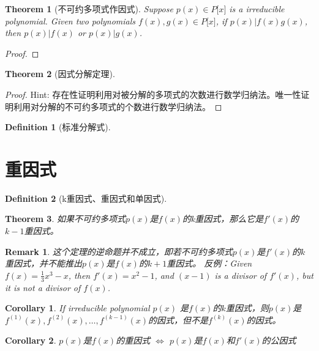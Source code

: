 \documentclass[onecolumn]{ctexart}
\newtheorem{definition}{Definition}
\newtheorem{theorem}{Theorem}
\newtheorem{corollary}{Corollary}
\newtheorem{remark}{Remark}
\begin{document}
\begin{theorem}[不可约多项式作因式]
  Suppose $p(x) \in P\lbrack x \rbrack$ is a irreducible polynomial. Given two 
  polynomials $f(x), g(x) \in P\lbrack x \rbrack$, if $p(x) | f(x)g(x)$, then 
  $p(x) | f(x)$ or $p(x) | g(x)$.
\end{theorem}
\begin{proof}
  
\end{proof}

\begin{theorem}[因式分解定理]
  
\end{theorem}
\begin{proof}
  Hint: 存在性证明利用对被分解的多项式的次数进行数学归纳法。唯一性证明利用对分解的不可约多项式的个数进行数学归纳法。
\end{proof}

\begin{definition}[标准分解式]
  
\end{definition}

\section{重因式}

\begin{definition}[k重因式、重因式和单因式]
  
\end{definition}

\begin{theorem}
  如果不可约多项式$p(x)$是$f(x)$的k重因式，那么它是$f'(x)$的$k-1$重因式。
\end{theorem}
\begin{remark}
  这个定理的逆命题并不成立，即若不可约多项式$p(x)$是$f'(x)$的$k$重因式，并不能推出$p(x)$是$f(x)$的$k+1$重因式。
  反例：Given $f(x) = \frac{1}{3}x^3 - x$, then $f'(x) = x^2 - 1$, and $(x - 1)$ is a divisor of 
  $f'(x)$, but it is not a divisor of $f(x)$.
\end{remark}

\begin{corollary}
  If irreducible polynomial $p(x)$ 是$f(x)$的$k$重因式，则$p(x)$是$f^{(1)}(x), f^{(2)}(x), \ldots, 
  f^{(k-1)}(x)$的因式，但不是$f^{(k)}(x)$的因式。
\end{corollary}

\begin{corollary}
  $p(x)$是$f(x)$的重因式 $\Leftrightarrow$ $p(x)$是$f(x)$和$f'(x)$的公因式
\end{corollary}
\end{document}
